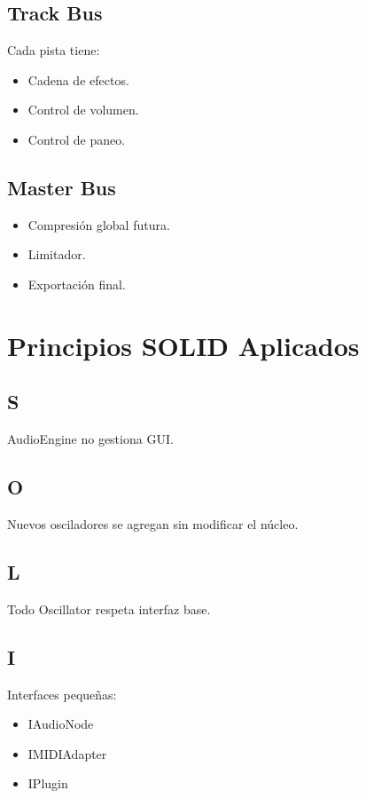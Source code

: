 \documentclass[12pt]{article}
\begin{document}
\subsection{Track Bus}

Cada pista tiene:
\begin{itemize}
    \item Cadena de efectos.
    \item Control de volumen.
    \item Control de paneo.
\end{itemize}

\subsection{Master Bus}

\begin{itemize}
    \item Compresión global futura.
    \item Limitador.
    \item Exportación final.
\end{itemize}

\section{Principios SOLID Aplicados}

\subsection{S}
AudioEngine no gestiona GUI.

\subsection{O}
Nuevos osciladores se agregan sin modificar el núcleo.

\subsection{L}
Todo Oscillator respeta interfaz base.

\subsection{I}
Interfaces pequeñas:
\begin{itemize}
    \item IAudioNode
    \item IMIDIAdapter
    \item IPlugin
\end{itemize}
\end{document}
